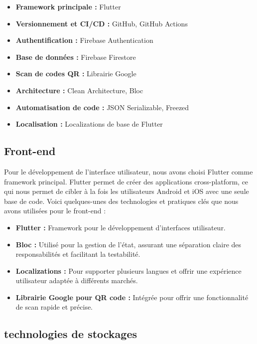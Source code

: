 \begin{itemize}[noitemsep]
    \item \textbf{Framework principale :} Flutter
    \item \textbf{Versionnement et CI/CD :} GitHub, GitHub Actions
    \item \textbf{Authentification :} Firebase Authentication
    \item \textbf{Base de données :} Firebase Firestore
    \item \textbf{Scan de codes QR :} Librairie Google
    \item \textbf{Architecture :} Clean Architecture, Bloc
    \item \textbf{Automatisation de code :} JSON Serializable, Freezed
    \item \textbf{Localisation :} Localizations de base de Flutter
\end{itemize}

\subsection{Front-end}

Pour le développement de l'interface utilisateur, nous avons choisi Flutter comme framework principal. Flutter permet de créer des applications cross-platform, ce qui nous permet de cibler à la fois les utilisateurs Android et iOS avec une seule base de code. Voici quelques-unes des technologies et pratiques clés que nous avons utilisées pour le front-end :

\begin{itemize}[noitemsep]
    \item \textbf{Flutter :} Framework pour le développement d'interfaces utilisateur.
    \item \textbf{Bloc :} Utilisé pour la gestion de l'état, assurant une séparation claire des responsabilités et facilitant la testabilité.
    \item \textbf{Localizations :} Pour supporter plusieurs langues et offrir une expérience utilisateur adaptée à différents marchés.
    \item \textbf{Librairie Google pour QR code :} Intégrée pour offrir une fonctionnalité de scan rapide et précise.
\end{itemize}

\subsection{technologies de stockages}

